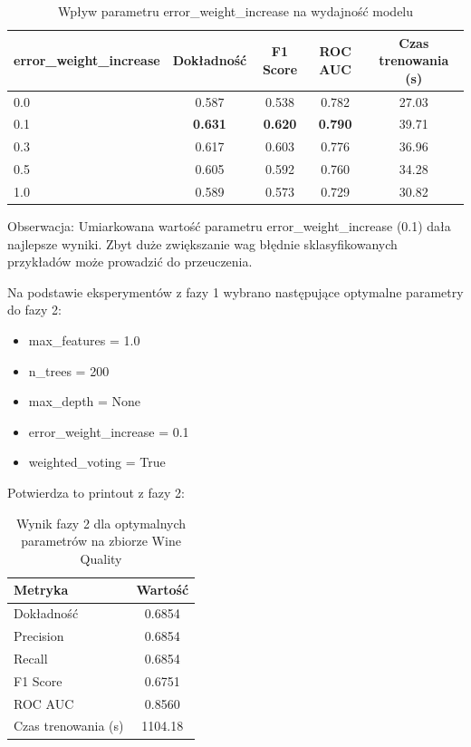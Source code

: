 \documentclass[11pt,a4paper]{article}
\begin{document}
\begin{table}[H]
\centering
\caption{Wpływ parametru error\_weight\_increase na wydajność modelu}
\label{tab:error_weight_increase}
\begin{tabular}{lcccc}
\toprule
error\_weight\_increase & Dokładność & F1 Score & ROC AUC & Czas trenowania (s) \\
\midrule
0.0 & 0.587 & 0.538 & 0.782 & 27.03 \\
0.1 & \textbf{0.631} & \textbf{0.620} & \textbf{0.790} & 39.71 \\
0.3 & 0.617 & 0.603 & 0.776 & 36.96 \\
0.5 & 0.605 & 0.592 & 0.760 & 34.28 \\
1.0 & 0.589 & 0.573 & 0.729 & 30.82 \\
\bottomrule
\end{tabular}
\end{table}

Obserwacja: Umiarkowana wartość parametru error\_weight\_increase (0.1) dała najlepsze wyniki. Zbyt duże zwiększanie wag błędnie sklasyfikowanych przykładów może prowadzić do przeuczenia.

Na podstawie eksperymentów z fazy 1 wybrano następujące optymalne parametry do fazy 2:
\begin{itemize}
    \item max\_features = 1.0
    \item n\_trees = 200
    \item max\_depth = None
    \item error\_weight\_increase = 0.1
    \item weighted\_voting = True
\end{itemize}

Potwierdza to printout z fazy 2:

\begin{table}[H]
\centering
\caption{Wynik fazy 2 dla optymalnych parametrów na zbiorze Wine Quality}
\label{tab:phase2}
\begin{tabular}{lc}
\toprule
Metryka & Wartość \\
\midrule
Dokładność & 0.6854 \\
Precision & 0.6854 \\
Recall & 0.6854 \\
F1 Score & 0.6751 \\
ROC AUC & 0.8560 \\
Czas trenowania (s) & 1104.18 \\
\bottomrule
\end{tabular}
\end{table}
\end{document}
